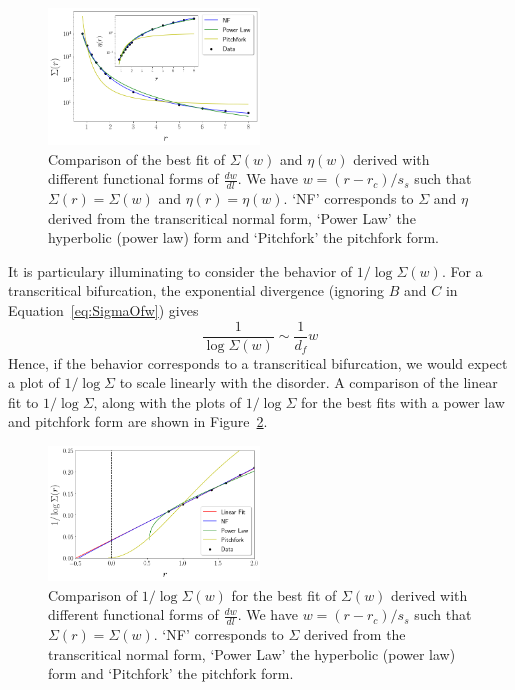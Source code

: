 \documentclass[reprint,amsmath,amssymb,aps,floatfix]{revtex4-1}
\begin{document}
\begin{figure}
		\includegraphics[width=0.5\textwidth]{comparison.png}
		\caption{ Comparison of the best fit of $\Sigma(w)$ and $\eta(w)$ derived with different functional forms of $\frac{dw}{dl}$. We have $w=(r-r_c)/s_s$ such that $\Sigma(r)=\Sigma(w)$ and $\eta(r)=\eta(w)$. `NF' corresponds to $\Sigma$ and $\eta$ derived from the transcritical normal form, `Power Law' the hyperbolic (power law) form and `Pitchfork' the pitchfork form.}
		\label{fig:comparison}
\end{figure}
%
It is particulary illuminating to consider the behavior of $1/\log\Sigma(w)$. For a transcritical bifurcation, the exponential divergence (ignoring $B$ and $C$ in Equation~\ref{eq:SigmaOfw}) gives
%
\begin{equation}
	\frac{1}{\log\Sigma(w)} \sim \frac{1}{d_f} w
\end{equation}
%
\noindent Hence, if the behavior corresponds to a transcritical bifurcation, we would expect a plot of $1/\log\Sigma$ to scale linearly with the disorder. A comparison of the linear fit to $1/\log\Sigma$, along with the plots of $1/\log\Sigma$ for the best fits with a power law and pitchfork form are shown in Figure~\ref{fig:logplot}.
%
\begin{figure}
		\includegraphics[width=0.5\textwidth]{logplot.png}
		\caption{Comparison of $1/\log\Sigma(w)$ for the best fit of $\Sigma(w)$ derived with different functional forms of $\frac{dw}{dl}$. We have $w=(r-r_c)/s_s$ such that $\Sigma(r)=\Sigma(w)$. `NF' corresponds to $\Sigma$ derived from the transcritical normal form, `Power Law' the hyperbolic (power law) form and `Pitchfork' the pitchfork form.}
		\label{fig:logplot}
\end{figure}
\end{document}
